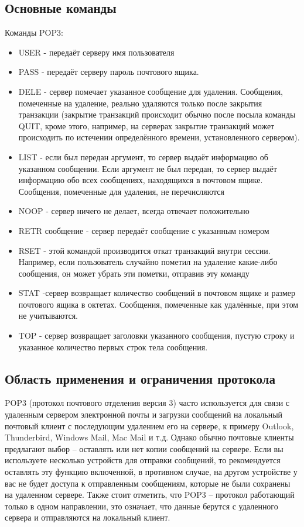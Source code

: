 \subsection{Основные команды}
Команды POP3:
\begin{itemize}
\item USER - передаёт серверу имя пользователя
\item PASS - передаёт серверу пароль почтового ящика.
\item DELE - сервер помечает указанное сообщение для удаления.  Сообщения, помеченные на удаление, реально удаляются только после закрытия транзакции (закрытие транзакций происходит обычно после посыла команды QUIT, кроме этого, например, на серверах закрытие транзакций может происходить по истечении определённого времени, установленного сервером).
\item LIST - если был передан аргумент, то сервер выдаёт информацию об указанном сообщении. Если аргумент не был передан, то сервер выдаёт информацию обо всех сообщениях, находящихся в почтовом ящике. Сообщения, помеченные для удаления, не перечисляются
\item NOOP - сервер ничего не делает, всегда отвечает положительно
\item RETR сообщение - сервер передаёт сообщение с указанным номером
\item RSET - этой командой производится откат транзакций внутри сессии. Например, если пользователь случайно пометил на удаление какие-либо сообщения, он может убрать эти пометки, отправив эту команду
\item STAT -сервер возвращает количество сообщений в почтовом ящике и размер почтового ящика в октетах. Сообщения, помеченные как удалённые, при этом не учитываются. 
\item TOP - сервер возвращает заголовки указанного сообщения, пустую строку и указанное количество первых строк тела сообщения.
\end{itemize}

\subsection{Область применения и ограничения протокола}
POP3 (протокол почтового отделения версия 3) часто используется для связи с удаленным сервером электронной почты и загрузки сообщений на локальный почтовый клиент с последующим удалением его на сервере, к примеру Outlook, Thunderbird, Windows Mail, Mac Mail и т.д. Однако обычно почтовые клиенты предлагают выбор – оставлять или нет копии сообщений на сервере. Если вы используете несколько устройств для отправки сообщений, то рекомендуется оставлять эту функцию включенной, в противном случае, на другом устройстве у вас не будет доступа к отправленным сообщениям, которые не были сохранены на удаленном сервере. Также стоит отметить, что POP3 – протокол работающий только в одном направлении, это означает, что данные берутся с удаленного сервера и отправляются на локальный клиент.

